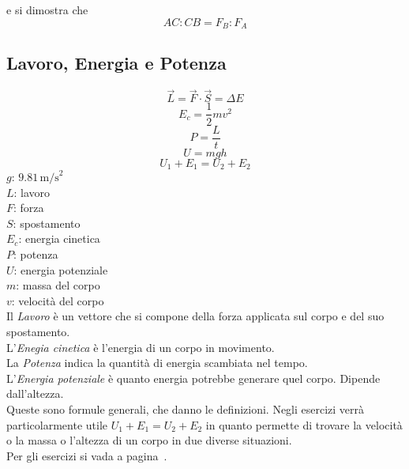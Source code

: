 e si dimostra che 
\begin{equation*}
  AC:CB=F_B:F_A
\end{equation*}

\subsection{Lavoro, Energia e Potenza}\label{subsec:dinamica:potenziale}
\begin{equation*}
\vec{L} = \vec{F} \cdot \vec{S} = \Delta E
\end{equation*}
\begin{equation*}
E_c = \frac{1}{2}mv^2
\end{equation*}
\begin{equation*}
P = \frac{L}{t}
\end{equation*}
\begin{equation*}
U = mgh
\end{equation*}
\begin{equation*}
U_1 + E_1 = U_2 + E_2
\end{equation*}
\hyperref[tab:g]{$g$}: $9.81\,\text{m/s}^2$\\
$L$: lavoro\\
$F$: forza\\
$S$: spostamento\\
$E_c$: energia cinetica\\
$P$: potenza\\
$U$: energia potenziale\\
$m$: massa del corpo\\
$v$: velocità del corpo\\[\baselineskip]
Il \emph{Lavoro} è un vettore che si compone della forza applicata sul corpo e del suo spostamento.\\
L'\emph{Enegia cinetica} è l'energia di un corpo in movimento.\\
La \emph{Potenza} indica la quantità di energia scambiata nel tempo.\\
L'\emph{Energia potenziale} è quanto energia potrebbe generare quel corpo. Dipende dall'altezza.\\

Queste sono formule generali, che danno le definizioni. Negli esercizi verrà particolarmente utile
$U_1 + E_1 = U_2 + E_2$ in quanto permette di trovare la velocità o la massa o l'altezza di un corpo
in due diverse situazioni.\\
Per gli esercizi si vada a pagina~\pageref{ex:potenziale}.\\[\baselineskip]

